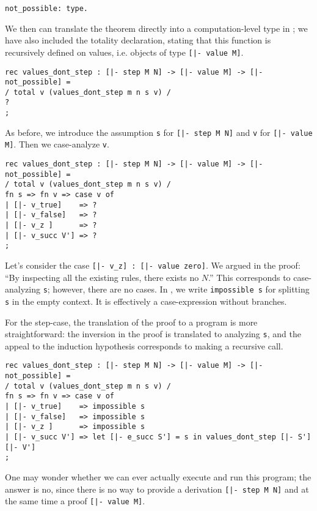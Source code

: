 \begin{lstlisting}
not_possible: type.
\end{lstlisting}

We then can translate the theorem directly into a computation-level type in
\beluga; we have also included the totality  declaration,
stating that this function is recursively defined on values, i.e. objects of type
\lstinline![|- value M]!.

\begin{lstlisting}
rec values_dont_step : [|- step M N] -> [|- value M] -> [|- not_possible] =
/ total v (values_dont_step m n s v) /
?
;
\end{lstlisting}

As before, we introduce the assumption \lstinline!s! for
\lstinline![|- step M N]! and \lstinline!v! for
\lstinline![|- value M]!. Then we case-analyze \lstinline!v!.

\begin{lstlisting}
rec values_dont_step : [|- step M N] -> [|- value M] -> [|- not_possible] =
/ total v (values_dont_step m n s v) /
fn s => fn v => case v of
| [|- v_true]    => ?
| [|- v_false]   => ?
| [|- v_z ]      => ?
| [|- v_succ V'] => ?
;
\end{lstlisting}

Let's consider the case \lstinline![|- v_z] : [|- value zero]!. We argued in the
proof: ``By inspecting all the existing rules, there exists no $N$.'' This
corresponds to case-analyzing \lstinline!s!; however, there are no cases. In
\beluga, we write \lstinline!impossible s! for splitting \lstinline!s! in
the empty context. It is effectively a case-expression without branches.

For the step-case, the translation of the proof to a program is more
straightforward: the inversion in the proof is translated to analyzing
\lstinline!s!, and the appeal to the induction hypothesis corresponds to making a
recursive call.

\begin{lstlisting}
rec values_dont_step : [|- step M N] -> [|- value M] -> [|- not_possible] =
/ total v (values_dont_step m n s v) /
fn s => fn v => case v of
| [|- v_true]    => impossible s
| [|- v_false]   => impossible s
| [|- v_z ]      => impossible s
| [|- v_succ V'] => let [|- e_succ S'] = s in values_dont_step [|- S'] [|- V']
;
\end{lstlisting}

One may wonder whether we can ever actually execute and run this program; the
answer is no, since there is no way to provide a derivation
\lstinline![|- step M N]! and at the same time a proof \lstinline![|- value M]!.

